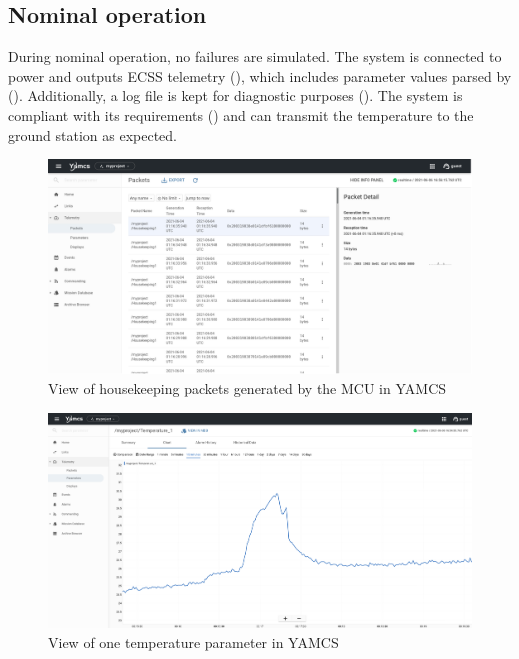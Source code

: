 \documentclass[a4paper,nobib]{tufte-book}
\begin{document}
\subsection{Nominal operation}

During nominal operation, no failures are simulated. The system is connected to power and outputs \ac{ECSS} telemetry (), which includes parameter values parsed by (). Additionally, a log file is kept for diagnostic purposes (). The system is compliant with its requirements () and can transmit the temperature to the ground station as expected.

\begin{figure}
	\centering
	\includegraphics{media/screenshots/yamcs_housekeeping}
	\caption{View of housekeeping packets generated by the \acs{MCU} in \acs{YAMCS}}
	\label{fig:yamcshousekeeping}
\end{figure}

\begin{figure}[h]
	\centering
	\includegraphics{media/screenshots/yamcs_parameter}
	\caption{View of one temperature parameter in \acs{YAMCS}}
	\label{fig:yamcsparameter}
\end{figure}
\end{document}
